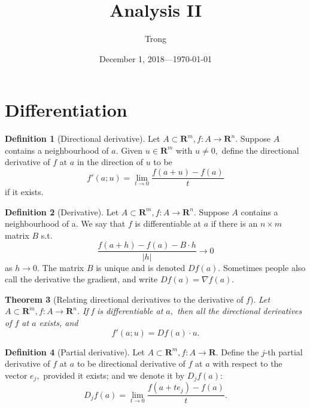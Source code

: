 \documentclass[17pt]{extarticle}
\title{Analysis II}
\author{Trong}
\date{December 1, 2018---\today}
\theoremstyle{plain}
\newtheorem{theorem}{Theorem}
\theoremstyle{definition}
\newtheorem{definition}[theorem]{Definition}
\theoremstyle{remark}
\newcommand{\bR}{\mathbf R}
\begin{document}
\sloppy
\maketitle

\tableofcontents

\section{Differentiation}

\begin{definition}[Directional derivative]
  Let \( A \subset \bR^m, f: A\longrightarrow \bR^n. \) Suppose $A$ contains a neighbourhood of \( a. \) Given \( u \in \bR^m \) with \( u \neq 0, \) define the directional derivative of \( f \) at \( a \) in the direction of \( u \) to be
  \[
  f'(a; u) = \lim_{t\to 0} \frac{f(a+u) - f(a)}{t}
  \]
if it exists.
\end{definition}

\begin{definition}[Derivative]
  Let \( A \subset \bR^m, f: A\longrightarrow \bR^n. \) Suppose $A$ contains a
  neighbourhood of a. We say that \( f \) is differentiable at \( a \) if there
  is an \( n\times m \) matrix $B$ s.t.
\[
\frac{f(a+h) - f(a) - B\cdot h}{|h|} \longrightarrow 0
\]
as \( h \longrightarrow 0. \) The matrix $B$ is unique and is denoted \( D f(a).
\) Sometimes people also call the derivative the gradient, and write \( D f(a) =
\nabla f(a). \)
\end{definition}

\begin{theorem}[Relating directional derivatives to the derivative of \( f \)]
  Let \( A \subset \bR^m, f: A\longrightarrow \bR^n. \) If f is differentiable at \( a, \) then all the directional derivatives of \( f \) at \( a \) exists, and
\[
f'(a; u) = D f(a) \cdot u.
\]
\end{theorem}

\begin{definition}[Partial derivative]
  Let \( A \subset \bR^m, f: A \longrightarrow \bR. \) Define the \( j \)-th partial derivative of \( f \) at \( a \) to be directional derivative of \( f \) at \( a \) with respect to the vector \( e_j, \) provided it exists; and we denote it by \( D_j f(a): \)
  \[
  D_j f(a) = \lim_{t\to 0} \frac{f(a + t e_j) - f(a)}{t}.
  \]
\end{definition}
\end{document}
